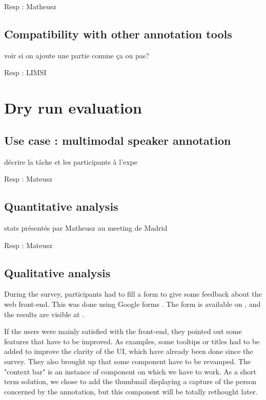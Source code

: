 \documentclass[a4paper]{article}
\begin{document}
Resp : Matheusz

      \subsection{Compatibility with other annotation tools}
voir si on ajoute une partie comme ça ou pas?

Resp : LIMSI



  \section{Dry run evaluation}
      \subsection{Use case : multimodal speaker annotation}
     
décrire la tâche et les participants à l'expe

Resp : Mateusz
      
      \subsection{Quantitative analysis}
    
stats présentés par Matheusz au meeting de Madrid

Resp : Mateusz
  
     \subsection{Qualitative analysis}
    

During the survey, participants had to fill a form to give some  feedback about the web front-end. This was done using Google forms \cite{url-google-forms}. The form is available on \cite{url-list-form}, and the results are visible at \cite{url-list-form-results}.

If the users were mainly satisfied with the front-end, they pointed out some features that have to be improved. As examples, some tooltips or titles had to be added to improve the clarity of the UI, which have already been done since the survey. They also brought up that some component have to be revamped. The "context bar" is an instance of component on which we have to work. As a short term solution, we chose to add the thumbnail displaying a capture of the person concerned by the annotation, but this component will be totally rethought later.
\end{document}
